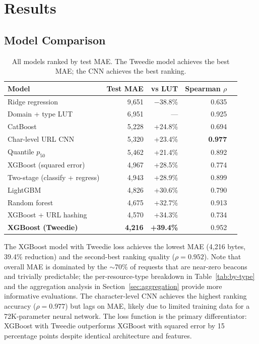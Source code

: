 \documentclass[11pt]{article}
\begin{document}
\section{Results}
\label{sec:results}

\subsection{Model Comparison}

\begin{table}[h]
\centering
\small
\begin{tabular}{lrrrr}
\toprule
Model & Test MAE & vs LUT & Spearman $\rho$ \\
\midrule
Ridge regression & 9,651 & $-$38.8\% & 0.635 \\
Domain + type LUT & 6,951 & --- & 0.925 \\
CatBoost & 5,228 & +24.8\% & 0.694 \\
Char-level URL CNN & 5,320 & +23.4\% & \textbf{0.977} \\
Quantile $p_{50}$ & 5,462 & +21.4\% & 0.892 \\
XGBoost (squared error) & 4,967 & +28.5\% & 0.774 \\
Two-stage (classify + regress) & 4,943 & +28.9\% & 0.899 \\
LightGBM & 4,826 & +30.6\% & 0.790 \\
Random forest & 4,675 & +32.7\% & 0.913 \\
XGBoost + URL hashing & 4,570 & +34.3\% & 0.734 \\
\textbf{XGBoost (Tweedie)} & \textbf{4,216} & \textbf{+39.4\%} & 0.952 \\
\bottomrule
\end{tabular}
\caption{All models ranked by test MAE. The Tweedie model achieves the best MAE; the CNN achieves the best ranking.}
\label{tab:all-results}
\end{table}

The XGBoost model with Tweedie loss achieves the lowest MAE (4,216 bytes, 39.4\% reduction) and the second-best ranking quality ($\rho = 0.952$). Note that overall MAE is dominated by the $\sim$70\% of requests that are near-zero beacons and trivially predictable; the per-resource-type breakdown in Table~\ref{tab:by-type} and the aggregation analysis in Section~\ref{sec:aggregation} provide more informative evaluations. The character-level CNN achieves the highest ranking accuracy ($\rho = 0.977$) but lags on MAE, likely due to limited training data for a 72K-parameter neural network. The loss function is the primary differentiator: XGBoost with Tweedie outperforms XGBoost with squared error by 15 percentage points despite identical architecture and features.
\end{document}
